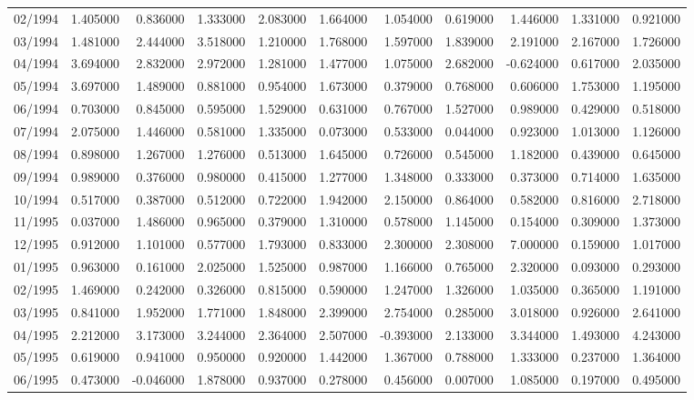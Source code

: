 \begin{tabular}{lrrrrrrrrrr}
02/1994 & 1.405000 & 0.836000 & 1.333000 & 2.083000 & 1.664000 & 1.054000 & 0.619000 & 1.446000 & 1.331000 & 0.921000 \\
03/1994 & 1.481000 & 2.444000 & 3.518000 & 1.210000 & 1.768000 & 1.597000 & 1.839000 & 2.191000 & 2.167000 & 1.726000 \\
04/1994 & 3.694000 & 2.832000 & 2.972000 & 1.281000 & 1.477000 & 1.075000 & 2.682000 & -0.624000 & 0.617000 & 2.035000 \\
05/1994 & 3.697000 & 1.489000 & 0.881000 & 0.954000 & 1.673000 & 0.379000 & 0.768000 & 0.606000 & 1.753000 & 1.195000 \\
06/1994 & 0.703000 & 0.845000 & 0.595000 & 1.529000 & 0.631000 & 0.767000 & 1.527000 & 0.989000 & 0.429000 & 0.518000 \\
07/1994 & 2.075000 & 1.446000 & 0.581000 & 1.335000 & 0.073000 & 0.533000 & 0.044000 & 0.923000 & 1.013000 & 1.126000 \\
08/1994 & 0.898000 & 1.267000 & 1.276000 & 0.513000 & 1.645000 & 0.726000 & 0.545000 & 1.182000 & 0.439000 & 0.645000 \\
09/1994 & 0.989000 & 0.376000 & 0.980000 & 0.415000 & 1.277000 & 1.348000 & 0.333000 & 0.373000 & 0.714000 & 1.635000 \\
10/1994 & 0.517000 & 0.387000 & 0.512000 & 0.722000 & 1.942000 & 2.150000 & 0.864000 & 0.582000 & 0.816000 & 2.718000 \\
11/1995 & 0.037000 & 1.486000 & 0.965000 & 0.379000 & 1.310000 & 0.578000 & 1.145000 & 0.154000 & 0.309000 & 1.373000 \\
12/1995 & 0.912000 & 1.101000 & 0.577000 & 1.793000 & 0.833000 & 2.300000 & 2.308000 & 7.000000 & 0.159000 & 1.017000 \\
01/1995 & 0.963000 & 0.161000 & 2.025000 & 1.525000 & 0.987000 & 1.166000 & 0.765000 & 2.320000 & 0.093000 & 0.293000 \\
02/1995 & 1.469000 & 0.242000 & 0.326000 & 0.815000 & 0.590000 & 1.247000 & 1.326000 & 1.035000 & 0.365000 & 1.191000 \\
03/1995 & 0.841000 & 1.952000 & 1.771000 & 1.848000 & 2.399000 & 2.754000 & 0.285000 & 3.018000 & 0.926000 & 2.641000 \\
04/1995 & 2.212000 & 3.173000 & 3.244000 & 2.364000 & 2.507000 & -0.393000 & 2.133000 & 3.344000 & 1.493000 & 4.243000 \\
05/1995 & 0.619000 & 0.941000 & 0.950000 & 0.920000 & 1.442000 & 1.367000 & 0.788000 & 1.333000 & 0.237000 & 1.364000 \\
06/1995 & 0.473000 & -0.046000 & 1.878000 & 0.937000 & 0.278000 & 0.456000 & 0.007000 & 1.085000 & 0.197000 & 0.495000 \\

\end{tabular}

